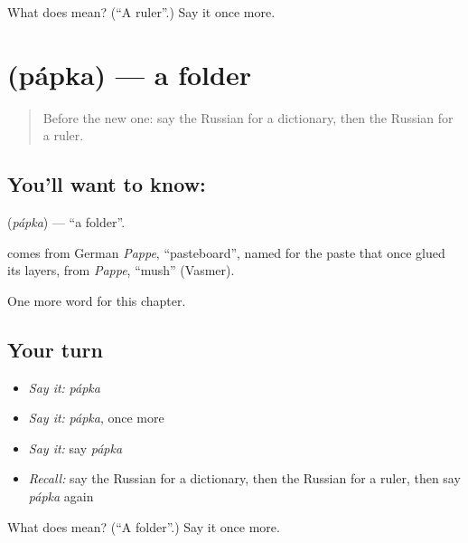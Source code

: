 \begin{tcolorbox}[breakable,colback=teal!4,colframe=teal!35!black,title={Before you move on}]
What does  mean? (\textquotedblleft{}A ruler\textquotedblright{}.) Say it once more.
\end{tcolorbox}
\section[\texorpdfstring{\ru{папка} (pápka)}{папка (pápka)}]{ (pápka) — a folder}

\label{lesson:RU-C192-papka}



\begin{quote}
Before the new one: say the Russian for a dictionary, then the Russian for a ruler.
\end{quote}

\subsection*{You'll want to know: }
\textbf{} (\emph{pápka}) — \textquotedblleft{}a folder\textquotedblright{}.

\begin{cousinweb}
\textbf{} comes from German \emph{Pappe}, \textquotedblleft{}pasteboard\textquotedblright{}, named for the paste that once glued its layers, from \emph{Pappe}, \textquotedblleft{}mush\textquotedblright{} (Vasmer).
\end{cousinweb}

\begin{grammarlens}[title={What you've built}]
One more word for this chapter.
\end{grammarlens}

\subsection*{Your turn}
\begin{itemize}
\raggedright
  \item \emph{Say it:} \emph{pápka}
  \item \emph{Say it:} \emph{pápka}, once more
  \item \emph{Say it:} say \emph{pápka}
  \item \emph{Recall:} say the Russian for a dictionary, then the Russian for a ruler, then say \emph{pápka} again
\end{itemize}

\begin{tcolorbox}[breakable,colback=teal!4,colframe=teal!35!black,title={Before you move on}]
What does  mean? (\textquotedblleft{}A folder\textquotedblright{}.) Say it once more.
\end{tcolorbox}
